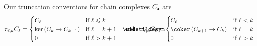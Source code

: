 \documentclass[a4paper,parskip=half,numbers=enddot, DIV=12]{scrreprt}
\renewcommand{\leq}{\leqslant}
\begin{document}
Our truncation conventions for chain complexes $C_\bullet$ are
\begin{align*}
\tau_{\leq k}C_\ell=\begin{cases}
C_\ell & \text{if }\ell\leq k\\
\ker\left(C_k\morphism C_{k-1}\right) & \text{if }\ell=k+1\\
0 & \text{if }\ell>k+1
\end{cases}\quad\text{and}\quad
\snake{\tau}_{\leq k}C_\ell=\begin{cases}
C_\ell & \text{if }\ell< k\\
\coker\left(C_{k+1}\morphism C_k\right) & \text{if }\ell=k\\
0 & \text{if }\ell>k
\end{cases}
\end{align*}
\end{document}
